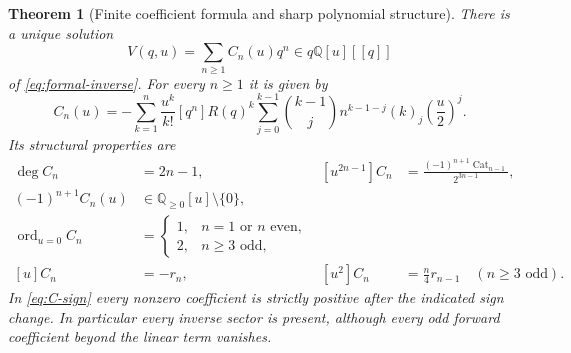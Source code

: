 \documentclass[11pt,a4paper]{article}
\numberwithin{equation}{section}
\newtheorem{theorem}{Theorem}[section]
\theoremstyle{definition}\newtheorem{definition}[theorem]{Definition}
\theoremstyle{remark}\newtheorem{remark}[theorem]{Remark}
\newcommand{\Cat}{\operatorname{Cat}}
\newcommand{\Q}{\mathbb Q}\newcommand{\N}{\mathbb N}
\begin{document}
\begin{theorem}[Finite coefficient formula and sharp polynomial structure]
\label{thm:inverse-coefficients}
There is a unique solution
\begin{equation}\label{eq:V-series}
 V(q,u)=\sum_{n\ge1}C_n(u)q^n\in q\Q[u][[q]]
\end{equation}
of \eqref{eq:formal-inverse}. For every $n\ge1$ it is given by
\begin{equation}\label{eq:C-formula}
 C_n(u)=-\sum_{k=1}^{n}\frac{u^k}{k!}[q^n]R(q)^k
 \sum_{j=0}^{k-1}\binom{k-1}{j}n^{k-1-j}(k)_j\left(\frac u2\right)^j.
\end{equation}
Its structural properties are
\begin{align}
 \deg C_n&=2n-1,&
 [u^{2n-1}]C_n&=\frac{(-1)^{n+1}\Cat_{n-1}}{2^{3n-1}},
 \label{eq:C-degree}\\
 (-1)^{n+1}C_n(u)&\in\Q_{\ge0}[u]\setminus\{0\},
 \label{eq:C-sign}\\
 \operatorname{ord}_{u=0}C_n
 &=\begin{cases}1,&n=1\text{ or }n\text{ even},\\2,&n\ge3\text{ odd},\end{cases}
 \label{eq:C-valuation}\\
 [u]C_n&=-r_n,&
 [u^2]C_n&=\frac n4r_{n-1}\quad(n\ge3\text{ odd}).
 \label{eq:C-lowest}
\end{align}
In \eqref{eq:C-sign} every nonzero coefficient is strictly positive
after the indicated sign change. In particular every inverse sector is
present, although every odd forward coefficient beyond the linear term
vanishes.
\end{theorem}
\end{document}
